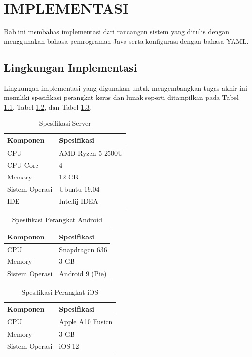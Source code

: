 \chapter {IMPLEMENTASI}
\par Bab ini membahas implementasi dari rancangan sistem yang ditulis dengan menggunakan bahasa pemrograman Java serta konfigurasi dengan bahasa YAML.

\section{Lingkungan Implementasi}
\par Lingkungan implementasi yang digunakan untuk mengembangkan tugas akhir ini memiliki spesifikasi perangkat keras dan lunak seperti ditampilkan pada Tabel \ref{tabel_spesifikasi_server}, Tabel \ref{tabel_spesifikasi_perangkat_android}, dan Tabel \ref{tabel_spesifikasi_perangkat_ios}.
\begin{longtable}{|p{3cm}|p{6.5cm}|}
	\caption{Spesifikasi Server} \label{tabel_spesifikasi_server} \\ \hline
	\rowcolor{lightgray} Komponen & Spesifikasi \\ \hline
	\endhead
	CPU & AMD Ryzen 5 2500U \\ \hline
	CPU Core & 4 \\ \hline
	Memory & 12 GB \\ \hline
	Sistem Operasi & Ubuntu 19.04 \\ \hline
	IDE & Intellij IDEA \\ \hline
\end{longtable}
\begin{longtable}{|p{3cm}|p{6.5cm}|}
	\caption{Spesifikasi Perangkat Android} \label{tabel_spesifikasi_perangkat_android} \\ \hline
	\rowcolor{lightgray} Komponen & Spesifikasi \\ \hline
	\endhead
	CPU & Snapdragon 636 \\ \hline
	Memory & 3 GB \\ \hline
	Sistem Operasi & Android 9 (Pie) \\ \hline
\end{longtable}
\begin{longtable}{|p{3cm}|p{6.5cm}|}
	\caption{Spesifikasi Perangkat iOS} \label{tabel_spesifikasi_perangkat_ios} \\ \hline
	\rowcolor{lightgray} Komponen & Spesifikasi \\ \hline
	\endhead
	CPU & Apple A10 Fusion \\ \hline
	Memory & 3 GB \\ \hline
	Sistem Operasi & iOS 12 \\ \hline
\end{longtable}

